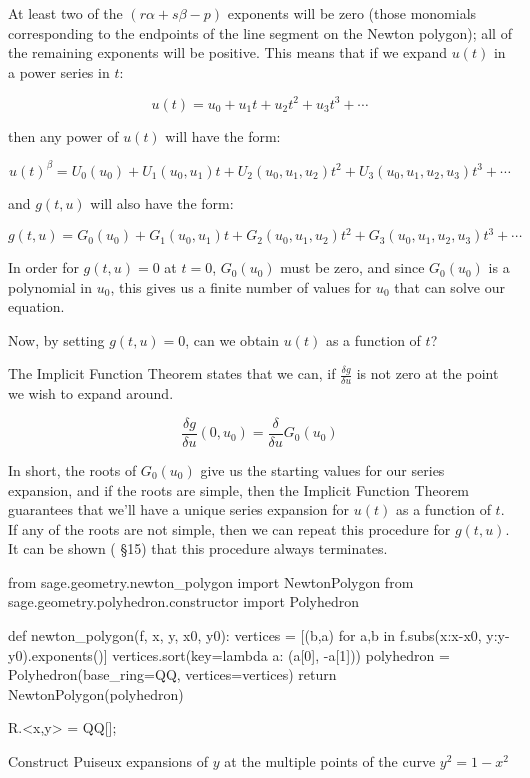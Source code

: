 At least two of the $(r \alpha + s \beta - p)$ exponents will be zero
(those monomials corresponding to the endpoints of the line segment on
the Newton polygon); all of the remaining exponents will be positive.
This means that if we expand $u(t)$ in a power series in $t$:

$$u(t) = u_0 + u_1 t + u_2 t^2 + u_3 t^3 + \cdots$$

then any power of $u(t)$ will have the form:

$$u(t)^\beta = U_0(u_0) + U_1(u_0, u_1) t + U_2(u_0, u_1, u_2) t^2 + U_3(u_0,u_1,u_2,u_3) t^3 + \cdots$$

and $g(t,u)$ will also have the form:

$$g(t,u) = G_0(u_0) + G_1(u_0, u_1) t + G_2(u_0, u_1, u_2) t^2 + G_3(u_0,u_1,u_2,u_3) t^3 + \cdots$$

In order for $g(t,u)=0$ at $t=0$, $G_0(u_0)$ must be zero, and since $G_0(u_0)$ is a polynomial
in $u_0$, this gives us a finite number of values for $u_0$ that can solve our equation.

Now, by setting $g(t,u)=0$, can we obtain $u(t)$ as a function of $t$?

The Implicit Function Theorem states that we can, if $\frac{\delta g}{\delta u}$ is not zero
at the point we wish to expand around.

$$\frac{\delta g}{\delta u}(0,u_0) = \frac{\delta}{\delta u} G_0(u_0)$$

In short, the roots of $G_0(u_0)$ give us the starting values for our series expansion,
and if the roots are simple, then the Implicit Function Theorem guarantees that we'll
have a unique series expansion for $u(t)$ as a function of $t$.  If any of the roots
are not simple, then we can repeat this procedure for $g(t,u)$.  It can be shown
(\cite{bliss} \S 15) that this procedure always terminates.

\vfill\eject

\begin{sagecode}
from sage.geometry.newton_polygon import NewtonPolygon
from sage.geometry.polyhedron.constructor import Polyhedron

def newton_polygon(f, x, y, x0, y0):
    vertices = [(b,a) for a,b in f.subs({x:x-x0, y:y-y0}).exponents()]
    vertices.sort(key=lambda a: (a[0], -a[1]))
    polyhedron = Polyhedron(base_ring=QQ, vertices=vertices)
    return NewtonPolygon(polyhedron)

R.<x,y> = QQ[];
\end{sagecode}

\example\label{y^2 = 1 - x^2}
Construct Puiseux expansions of $y$ at the multiple points of the
curve $y^2 = 1 - x^2$

